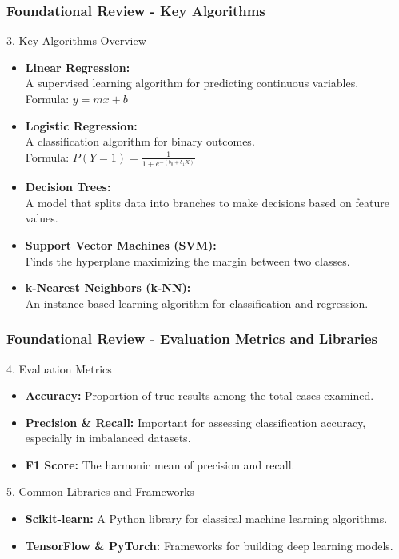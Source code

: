 \documentclass[aspectratio=169]{beamer}
\begin{document}
\begin{frame}[fragile]
    \frametitle{Foundational Review - Key Algorithms}
    \begin{block}{3. Key Algorithms Overview}
        \begin{itemize}
            \item \textbf{Linear Regression:}\\ 
            A supervised learning algorithm for predicting continuous variables.\\ 
            Formula: $y = mx + b$
            \item \textbf{Logistic Regression:}\\ 
            A classification algorithm for binary outcomes.\\ 
            Formula: $P(Y=1) = \frac{1}{1 + e^{-(b_0 + b_1X)}}$
            \item \textbf{Decision Trees:}\\ 
            A model that splits data into branches to make decisions based on feature values.
            \item \textbf{Support Vector Machines (SVM):}\\ 
            Finds the hyperplane maximizing the margin between two classes.
            \item \textbf{k-Nearest Neighbors (k-NN):}\\ 
            An instance-based learning algorithm for classification and regression.
        \end{itemize}
    \end{block}
\end{frame}

\begin{frame}[fragile]
    \frametitle{Foundational Review - Evaluation Metrics and Libraries}
    \begin{block}{4. Evaluation Metrics}
        \begin{itemize}
            \item \textbf{Accuracy:} Proportion of true results among the total cases examined.
            \item \textbf{Precision \& Recall:} Important for assessing classification accuracy, especially in imbalanced datasets.
            \item \textbf{F1 Score:} The harmonic mean of precision and recall.
        \end{itemize}
    \end{block}

    \begin{block}{5. Common Libraries and Frameworks}
        \begin{itemize}
            \item \textbf{Scikit-learn:} A Python library for classical machine learning algorithms.
            \item \textbf{TensorFlow \& PyTorch:} Frameworks for building deep learning models.
        \end{itemize}
    \end{block}
\end{frame}
\end{document}
